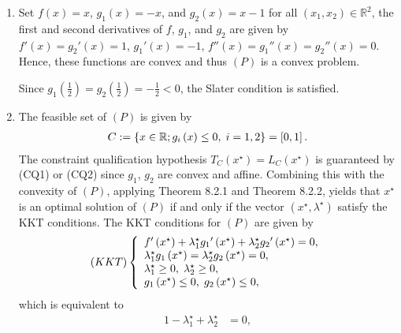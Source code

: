 \documentclass[a4paper]{article}
\numberwithin{equation}{section}
\begin{document}
\begin{enumerate}
\item Set $f\left( x \right) = x$, ${g_1}\left( x \right) =  - x$, and ${g_2}\left( x \right) = x - 1$ for all $\left(x_1,x_2\right)\in \mathbb{R}^2$, the first and second derivatives of $f$, $g_1$, and $g_2$ are given by $f'\left( x \right) = {g_2}'\left( x \right) = 1$, ${g_1}'\left( x \right) =  - 1$, $f''\left( x \right) = {g_1}''\left( x \right) = {g_2}''\left( x \right) = 0$. Hence, these functions are convex and thus $\left(P\right)$ is a convex problem.

Since ${g_1}\left( {\frac{1}{2}} \right) = {g_2}\left( {\frac{1}{2}} \right) =  - \frac{1}{2} <0$, the Slater condition is satisfied.
\item The feasible set of $\left(P\right)$ is given by
\begin{align}
C: = \left\{ {x \in \mathbb{R};{g_i}\left( x \right) \le 0,\hspace{0.1cm} i = 1,2} \right\} = \left[ {0,1} \right].
\end{align}
The constraint qualification hypothesis $T_C\left(x^\star\right)=L_C\left(x^\star\right)$ is guaranteed by (CQ1) or (CQ2) since $g_1$, $g_2$ are convex and affine. Combining this with the convexity of $\left(P\right)$, applying Theorem 8.2.1 and Theorem 8.2.2, \cite{2} yields that $x^\star$ is an optimal solution of $\left(P\right)$ if and only if the vector $\left(x^\star,\lambda^\star\right)$ satisfy the KKT conditions. The KKT conditions for $\left(P\right)$ are given by
\begin{align}
\label{1.103}
\left( {KKT} \right)\left\{ {\begin{array}{*{20}{l}}
{f'\left( {{x^\star}} \right) + \lambda _1^\star{g_1}'\left( {{x^\star}} \right) + \lambda _2^\star{g_2}'\left( {{x^\star}} \right) = 0,}\\
{\lambda _1^\star{g_1}\left( {{x^\star}} \right) = \lambda _2^\star{g_2}\left( {{x^\star}} \right) = 0,}\\
{\lambda _1^\star \ge 0, \hspace{0.1cm} \lambda _2^\star \ge 0,}\\
{{g_1}\left( {{x^\star}} \right) \le 0, \hspace{0.1cm}  {g_2}\left( {{x^\star}} \right) \le 0,}
\end{array}} \right.
\end{align}
which is equivalent to
\begin{align}
1 - \lambda _1^\star + \lambda _2^\star &= 0,\\

\end{align}
\end{enumerate}
\end{document}
